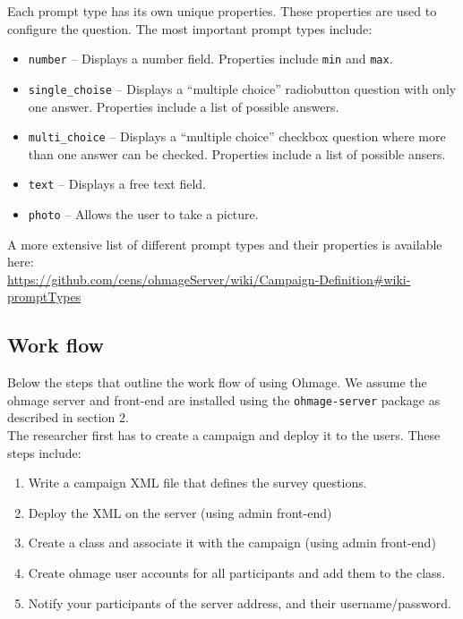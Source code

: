 \documentclass{scrartcl}
\begin{document}
Each prompt type has its own unique properties. These properties are used to
configure the question. The most important prompt types include:

\begin{itemize}
  \item \texttt{number} -- Displays a number field. Properties include
  \texttt{min} and \texttt{max}.
  \item \texttt{single\_choise} -- Displays a ``multiple choice'' radiobutton
  question with only one answer. Properties include a list of possible answers.
  \item \texttt{multi\_choice} -- Displays a ``multiple choice'' checkbox
  question where more than one answer can be checked. Properties include a list of
  possible ansers.
  \item \texttt{text} -- Displays a free text field.
  \item \texttt{photo} -- Allows the user to take a picture.
\end{itemize}

\noindent A more extensive list of different prompt types and their properties
is available here: \\

\url{https://github.com/cens/ohmageServer/wiki/Campaign-Definition#wiki-promptTypes}

\subsection{Work flow}

Below the steps that outline the work flow of using Ohmage. We assume the ohmage
server and front-end are installed using the \texttt{ohmage-server} package as
described in section 2.\\

\noindent The researcher first has to create a campaign and deploy it to the
users. These steps include:

\begin{enumerate}
  \item Write a campaign XML file that defines the survey questions.
  \item Deploy the XML on the server (using admin front-end)
  \item Create a class and associate it with the campaign (using admin
  front-end)
  \item Create ohmage user accounts for all participants and add them to
  the class.
  \item Notify your participants of the server address, and their
  username/password.
\end{enumerate}
\end{document}
